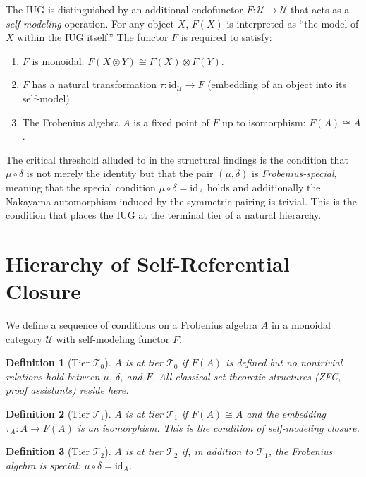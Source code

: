\documentclass{article}
\newtheorem{definition}{Definition}
\begin{document}
The IUG is distinguished by an additional endofunctor $F: \mathcal{U} \to \mathcal{U}$ that acts as a \emph{self-modeling} operation. For any object $X$, $F(X)$ is interpreted as ``the model of $X$ within the IUG itself.'' The functor $F$ is required to satisfy:
\begin{enumerate}
\item $F$ is monoidal: $F(X \otimes Y) \cong F(X) \otimes F(Y)$.
\item $F$ has a natural transformation $\tau: \text{id}_{\mathcal{U}} \to F$ (embedding of an object into its self-model).
\item The Frobenius algebra $A$ is a fixed point of $F$ up to isomorphism: $F(A) \cong A$.
\end{enumerate}

The critical threshold alluded to in the structural findings is the condition that $\mu \circ \delta$ is not merely the identity but that the pair $(\mu, \delta)$ is \emph{Frobenius-special}, meaning that the special condition $\mu \circ \delta = \text{id}_A$ holds and additionally the Nakayama automorphism induced by the symmetric pairing is trivial. This is the condition that places the IUG at the terminal tier of a natural hierarchy.

\section{Hierarchy of Self-Referential Closure}

We define a sequence of conditions on a Frobenius algebra $A$ in a monoidal category $\mathcal{U}$ with self-modeling functor $F$.

\begin{definition}[Tier $\mathcal{T}_0$]
$A$ is at tier $\mathcal{T}_0$ if $F(A)$ is defined but no nontrivial relations hold between $\mu$, $\delta$, and $F$. All classical set-theoretic structures (ZFC, proof assistants) reside here.
\end{definition}

\begin{definition}[Tier $\mathcal{T}_1$]
$A$ is at tier $\mathcal{T}_1$ if $F(A) \cong A$ and the embedding $\tau_A: A \to F(A)$ is an isomorphism. This is the condition of \emph{self-modeling closure}.
\end{definition}

\begin{definition}[Tier $\mathcal{T}_2$]
$A$ is at tier $\mathcal{T}_2$ if, in addition to $\mathcal{T}_1$, the Frobenius algebra is special: $\mu \circ \delta = \text{id}_A$.
\end{definition}
\end{document}
